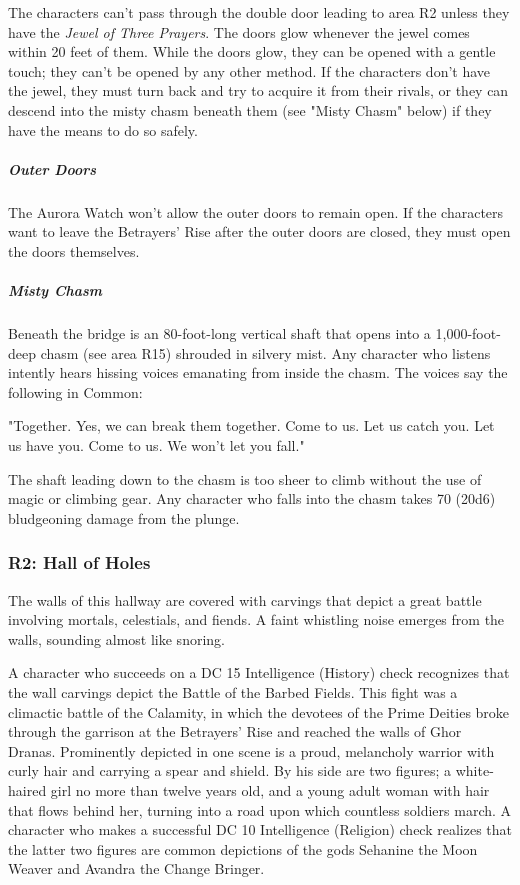 \documentclass[10pt,a4paper,twoside,bg=print,twocolumn,openany,nodeprecatedcode]{dndbook}
\begin{document}
The characters can't pass through the double door leading to area R2 unless they have the \textit{Jewel of Three Prayers}. The doors glow whenever the jewel comes within 20 feet of them. While the doors glow, they can be opened with a gentle touch; they can't be opened by any other method. If the characters don't have the jewel, they must turn back and try to acquire it from their rivals, or they can descend into the misty chasm beneath them (see "Misty Chasm" below) if they have the means to do so safely.

\subparagraph{Outer Doors}
The Aurora Watch won't allow the outer doors to remain open. If the characters want to leave the Betrayers' Rise after the outer doors are closed, they must open the doors themselves.

\subparagraph{Misty Chasm}
Beneath the bridge is an 80-foot-long vertical shaft that opens into a 1,000-foot-deep chasm (see area R15) shrouded in silvery mist. Any character who listens intently hears hissing voices emanating from inside the chasm. The voices say the following in Common:

\begin{DndReadAloud}{}
"Together. Yes, we can break them together. Come to us. Let us catch you. Let us have you. Come to us. We won't let you fall."

\end{DndReadAloud}

The shaft leading down to the chasm is too sheer to climb without the use of magic or climbing gear. Any character who falls into the chasm takes 70 (20d6) bludgeoning damage from the plunge.

\subsubsection{R2: Hall of Holes}
\begin{DndReadAloud}{}
The walls of this hallway are covered with carvings that depict a great battle involving mortals, celestials, and fiends. A faint whistling noise emerges from the walls, sounding almost like snoring.

\end{DndReadAloud}

A character who succeeds on a DC 15 Intelligence (History) check recognizes that the wall carvings depict the Battle of the Barbed Fields. This fight was a climactic battle of the Calamity, in which the devotees of the Prime Deities broke through the garrison at the Betrayers' Rise and reached the walls of Ghor Dranas. Prominently depicted in one scene is a proud, melancholy warrior with curly hair and carrying a spear and shield. By his side are two figures; a white-haired girl no more than twelve years old, and a young adult woman with hair that flows behind her, turning into a road upon which countless soldiers march. A character who makes a successful DC 10 Intelligence (Religion) check realizes that the latter two figures are common depictions of the gods Sehanine the Moon Weaver and Avandra the Change Bringer.
\end{document}
